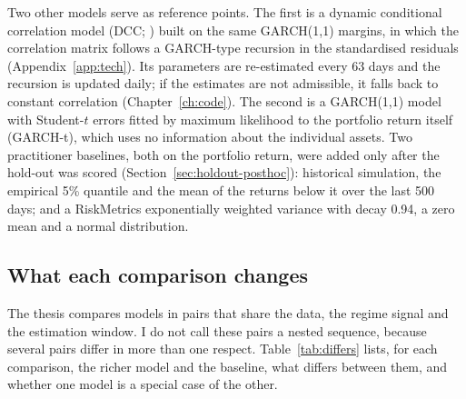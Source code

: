 Two other models serve as reference points. The first is a dynamic conditional correlation model (DCC; \citealp{engle2002}) built on the same GARCH(1,1) margins, in which the correlation matrix follows a GARCH-type recursion in the standardised residuals (Appendix~\ref{app:tech}). Its parameters are re-estimated every 63 days and the recursion is updated daily; if the estimates are not admissible, it falls back to constant correlation (Chapter~\ref{ch:code}). The second is a GARCH(1,1) model with Student-$t$ errors fitted by maximum likelihood to the portfolio return itself (GARCH-t), which uses no information about the individual assets. Two practitioner baselines, both on the portfolio return, were added only after the hold-out was scored (Section~\ref{sec:holdout-posthoc}): historical simulation, the empirical 5\% quantile and the mean of the returns below it over the last 500 days; and a RiskMetrics exponentially weighted variance with decay 0.94, a zero mean and a normal distribution.

\subsection{What each comparison changes}\label{sec:ladder-design}

The thesis compares models in pairs that share the data, the regime signal and the estimation window. I do not call these pairs a nested sequence, because several pairs differ in more than one respect. Table~\ref{tab:differs} lists, for each comparison, the richer model and the baseline, what differs between them, and whether one model is a special case of the other.

